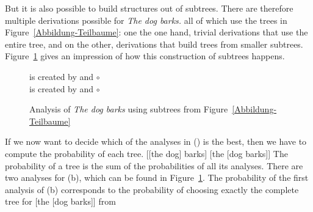 But it is also possible to build structures out of subtrees. There are therefore multiple derivations possible
for \emph{The dog
  barks.} all of which use the trees in Figure~\ref{Abbildung-Teilbaume}: 
  one the one hand, trivial derivations that use the entire tree, and on the other, derivations that
  build trees from smaller subtrees.
Figure~\ref{Abbildung-Analyse} gives an impression of how this construction of subtrees happens.
\begin{figure}
\hfill
{}
is created by
and
$\circ$
\hfill\mbox{}
\\[3ex]
\hfill{}
is created by
and
$\circ$
\hfill\mbox{}
\caption{\label{Abbildung-Analyse}Analysis of \emph{The dog barks} using subtrees from Figure~\ref{Abbildung-Teilbaume}}
\end{figure}%
If we now want to decide which of the analyses in () is the best, then we have to compute the probability of each tree.
\eal
\ex {}[[the dog] barks]
\ex {}[the [dog barks]]
\zl
The probability of a tree is the sum of the probabilities of all its analyses.
There are two analyses for (b), which can be found in Figure~\ref{Abbildung-Analyse}.
The probability of the first analysis of (b) corresponds to the probability of choosing exactly the complete tree for [the [dog barks]] from
